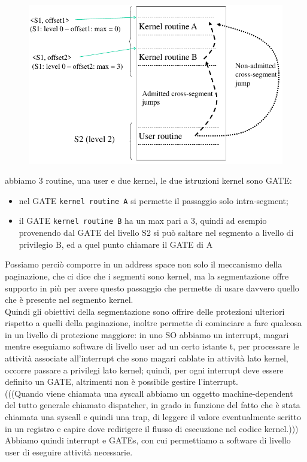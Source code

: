 \documentclass[12pt, oneside]{extbook}
\begin{document}
\begin{figure}[!h]
	\includegraphics[scale=0.3]{immagini/routine_priv.png}
\end{figure}
abbiamo 3 routine, una user e due kernel, le due istruzioni kernel sono GATE:
\begin{itemize}
\item nel GATE \texttt{kernel routine A} si permette il passaggio solo intra-segment;
\item il GATE \texttt{kernel routine B} ha un max pari a 3, quindi ad esempio provenendo dal GATE del livello S2 si può saltare nel segmento a livello di privilegio B, ed a quel punto chiamare il GATE di A
\end{itemize}
Possiamo perciò comporre in un address space non solo il meccanismo della paginazione, che ci dice che i segmenti sono kernel, ma la segmentazione offre supporto in più per avere questo passaggio che permette di usare davvero quello che è presente nel segmento kernel.\\ Quindi gli obiettivi della segmentazione sono offrire delle protezioni ulteriori rispetto a quelli della paginazione, inoltre permette di cominciare a fare qualcosa in un livello di protezione maggiore: in uno SO abbiamo un interrupt, magari mentre eseguiamo software di livello user ad un certo istante t, per processare le attività associate all'interrupt che sono magari cablate in attività lato kernel, occorre passare a privilegi lato kernel; quindi, per ogni interrupt deve essere definito un GATE, altrimenti non è possibile gestire l'interrupt.\\ 
(((Quando viene chiamata una syscall abbiamo un oggetto machine-dependent del tutto generale chiamato dispatcher, in grado in funzione del fatto che è stata chiamata una syscall e quindi una trap, di leggere il valore eventualmente scritto in un registro e capire dove redirigere il flusso di esecuzione nel codice kernel.)))\\Abbiamo quindi interrupt e GATEs, con cui permettiamo a software di livello user di eseguire attività necessarie.
\end{document}
